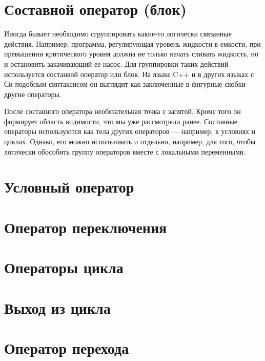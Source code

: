 \documentclass[book.tex]{subfiles}
\begin{document}



\maketitle 

\section*{Составной оператор (блок)}

Иногда бывает необходимо сгруппировать какие-то логически связанные действия. Например, программа, регулирующая уровень жидкости в емкости, при превышении критического уровня должна не только начать сливать жидкость, но и остановить закачивающий ее насос. Для группировки таких действий используется состанвой оператор или блок. На языке C++ и в других языках с Си-подобным синтаксисом он выглядит как заключенные в фигурные скобки \cppword{\{\}} другие операторы.

После составного оператора необязательная точка с запятой. Кроме того он формирует область видимости, что мы уже рассмотрели ранее. Составные операторы используются как тела других операторов --- например, в условиях и циклах. Однако, его можно использовать и отдельно, например, для того, чтобы логически обособить группу операторов вместе с локальными переменными.

\section*{Условный оператор}

\section*{Оператор переключения}

\section*{Операторы цикла}

\section*{Выход из цикла}

\section*{Оператор перехода}
\end{document}
